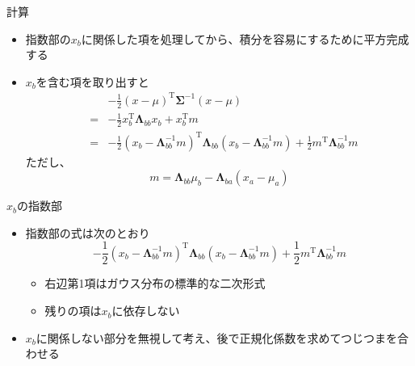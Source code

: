 \begin{frame}{計算}
 \begin{itemize}
  \item 指数部の$x_b$に関係した項を処理してから、積分を容易にするために平方完成する
  \item $x_b$を含む項を取り出すと
        \begin{eqnarray*}
         && -\frac{1}{2}(x - \mu)^{\mathrm{T}}\bm{\Sigma}^{-1}(x-\mu) \\
         &=&-\frac{1}{2}x^{\mathrm{T}}_b\bm{\Lambda}_{bb}x_b+x^{\mathrm{T}}_bm \\
         &=& -\frac{1}{2}(x_b-\bm{\Lambda}_{bb}^{-1}m)^{\mathrm{T}}\bm{\Lambda}_{bb}(x_b-\bm{\Lambda}_{bb}^{-1}m) + \frac{1}{2}m^{\mathrm{T}}\bm{\Lambda}_{bb}^{-1}m
        \end{eqnarray*}
        ただし、
        \begin{equation*}
         m =  \bm{\Lambda}_{bb}\mu_b - \bm{\Lambda}_{ba}(x_a-\mu_a)
        \end{equation*}
 \end{itemize}
\end{frame}

\begin{frame}{$x_b$の指数部}
 \begin{itemize}
  \item 指数部の式は次のとおり
        \begin{equation}
         -\frac{1}{2}(x_b-\bm{\Lambda}_{bb}^{-1}m)^{\mathrm{T}}\bm{\Lambda}_{bb}(x_b-\bm{\Lambda}_{bb}^{-1}m) + \frac{1}{2}m^{\mathrm{T}}\bm{\Lambda}_{bb}^{-1}m
        \end{equation}
        \begin{itemize}
         \item 右辺第1項はガウス分布の標準的な二次形式
         \item 残りの項は$x_b$に依存しない
        \end{itemize}
  \item $x_b$に関係しない部分を無視して考え、後で正規化係数を求めてつじつまを合わせる
 \end{itemize}
\end{frame}


